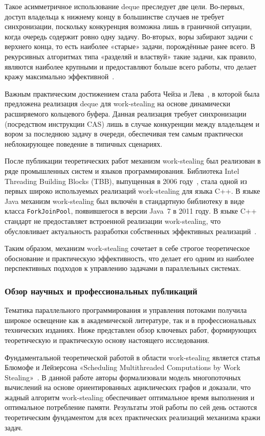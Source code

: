 Такое асимметричное использование deque преследует две цели.
Во-первых, доступ владельца к нижнему концу в большинстве случаев
не требует синхронизации, поскольку конкуренция возможна лишь
в граничной ситуации, когда очередь содержит ровно одну задачу.
Во-вторых, воры забирают задачи с верхнего конца, то есть наиболее
«старые» задачи, порождённые ранее всего. В рекурсивных алгоритмах
типа «разделяй и властвуй» такие задачи, как правило, являются
наиболее крупными и предоставляют больше всего работы, что делает
кражу максимально эффективной~\cite{Acar2000}.

Важным практическим достижением стала работа Чейза и Лева~\cite{Chase2005},
в которой была предложена реализация deque для work-stealing на основе
динамически расширяемого кольцевого буфера. Данная реализация требует
синхронизации (посредством инструкции CAS) лишь в случае конкуренции
между владельцем и вором за последнюю задачу в очереди, обеспечивая
тем самым практически неблокирующее поведение в типичных сценариях.

После публикации теоретических работ механизм work-stealing был
реализован в ряде промышленных систем и языков программирования.
Библиотека Intel Threading Building Blocks (TBB), выпущенная в 2006
году~\cite{Reinders2007}, стала одной из первых широко используемых реализаций
work-stealing для языка C++. В языке Java механизм
work-stealing был включён в стандартную библиотеку в виде класса
\texttt{ForkJoinPool}, появившегося в версии Java~7 в 2011 году.
В языке C++ стандарт не предоставляет встроенной реализации
work-stealing, что обусловливает актуальность разработки собственных
эффективных реализаций~\cite{Williams2019}.

Таким образом, механизм work-stealing сочетает в себе строгое
теоретическое обоснование и практическую эффективность, что делает
его одним из наиболее перспективных подходов к управлению задачами
в параллельных системах.

\subsubsection{Обзор научных и профессиональных публикаций}

Тематика параллельного программирования и управления потоками
получила широкое освещение как в академической литературе, так
и в профессиональных технических изданиях. Ниже представлен обзор
ключевых работ, формирующих теоретическую и практическую основу
настоящего исследования.

Фундаментальной теоретической работой в области work-stealing
является статья Блюмофе и Лейзерсона «Scheduling Multithreaded
Computations by Work Stealing»~\cite{Blumofe1999}. В данной работе
авторы формализовали модель многопоточных вычислений на основе
ориентированных ациклических графов и доказали, что жадный алгоритм
work-stealing обеспечивает оптимальное время выполнения и
оптимальное потребление памяти. Результаты этой работы по сей день
остаются теоретическим фундаментом для всех практических реализаций
механизма кражи задач.

